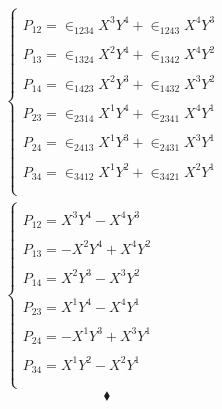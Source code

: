 \begin{align}
&\left\{\begin{array}{l}\\
P_{12} = \in_{1234}X^3Y^4+\in_{1243}X^4Y^3\\\\
P_{13} = \in_{1324}X^2Y^4+\in_{1342}X^4Y^2\\\\
P_{14} = \in_{1423}X^2Y^3+\in_{1432}X^3Y^2\\\\
P_{23} = \in_{2314}X^1Y^4+\in_{2341}X^4Y^1\\\\
P_{24} = \in_{2413}X^1Y^3+\in_{2431}X^3Y^1\\\\
P_{34} = \in_{3412}X^1Y^2+\in_{3421}X^2Y^1\\\\
\end{array}\right.\\
&\left\{\begin{array}{l}\\
P_{12} = X^3Y^4-X^4Y^3\\\\
P_{13} = -X^2Y^4+X^4Y^2\\\\
P_{14} = X^2Y^3-X^3Y^2\\\\
P_{23} = X^1Y^4-X^4Y^1\\\\
P_{24} = -X^1Y^3+X^3Y^1\\\\
P_{34} = X^1Y^2-X^2Y^1\\\\
\end{array}\right.
\end {align}
$$\blacklozenge$$
\newpage

